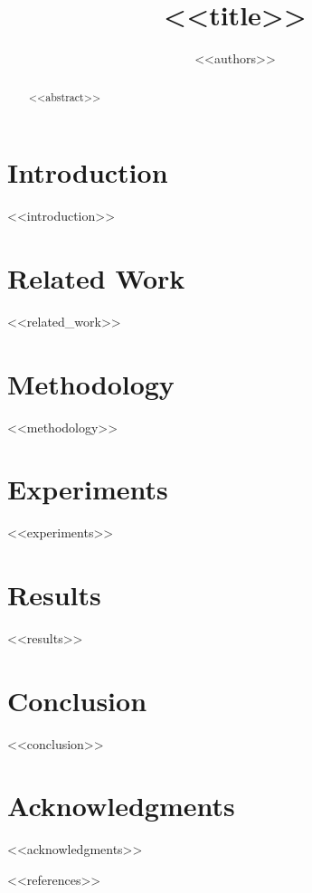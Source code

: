 \documentclass{article}
\title{<<title>>}
\author{<<authors>>}
\begin{document}
\maketitle

\begin{abstract}
<<abstract>>
\end{abstract}

\section{Introduction}
\label{sec:intro}

<<introduction>>

\section{Related Work}
\label{sec:related}

<<related_work>>

\section{Methodology}
\label{sec:method}

<<methodology>>

\section{Experiments}
\label{sec:experiments}

<<experiments>>

\section{Results}
\label{sec:results}

<<results>>

\section{Conclusion}
\label{sec:conclusion}

<<conclusion>>

\section*{Acknowledgments}

<<acknowledgments>>




<<references>>
\end{document}
